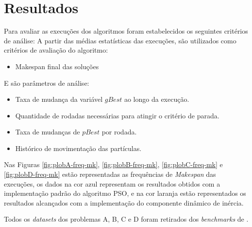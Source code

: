 \section{Resultados}
Para avaliar as execuções dos algoritmos foram estabelecidos os seguintes critérios de análise:
A partir das médias estatísticas das execuções, são utilizados como critérios de avaliação do algoritmo:
\begin{itemize}
\item Makespan final das soluções
\end{itemize}

\noindent E são parâmetros de análise:
\begin{itemize}
\item Taxa de mudança da variável $gBest$ ao longo da execução.
\item Quantidade de rodadas necessárias para atingir o critério de parada.
\item Taxa de mudanças de $pBest$ por rodada.
\item Histórico de movimentação das partículas.
\end{itemize}

Nas Figuras \ref{fig:plobA-freq-mk}, \ref{fig:plobB-freq-mk}, \ref{fig:plobC-freq-mk} e \ref{fig:plobD-freq-mk} 
estão representadas as frequências de \textit{Makespan} das execuções, os dados na cor azul representam os resultados obtidos com a implementação padrão do algoritmo PSO, e na cor laranja estão representados os resultados alcançados com a implementação do componente dinâmico de inércia.


Todos os \textit{datasets} dos problemas A, B, C e D foram retirados dos \textit{benchmarks} de \cite{Kacem2002}.
%


